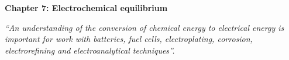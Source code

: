\renewcommand{\theequation}{7.\arabic{equation}}

\begin{frame}
\begin{center}
{\bf Chapter 7: Electrochemical equilibrium}\\
\end{center}

\scriptsize

\vspace*{3cm}

\begin{center}
\textit{``An understanding of the conversion of chemical energy to electrical energy is important for work with batteries, fuel cells, electroplating, corrosion, electrorefining and electroanalytical techniques''.}
\end{center}

\end{frame}

\scriptsize









